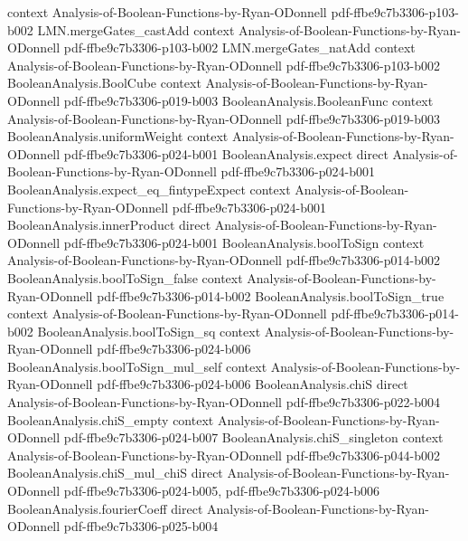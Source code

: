 \begin{lemma}
  {context}
  {Analysis-of-Boolean-Functions-by-Ryan-ODonnell}
  {pdf-ffbe9c7b3306-p103-b002}
\proofstep
  {LMN.mergeGates_castAdd}
  {context}
  {Analysis-of-Boolean-Functions-by-Ryan-ODonnell}
  {pdf-ffbe9c7b3306-p103-b002}
\proofstep
  {LMN.mergeGates_natAdd}
  {context}
  {Analysis-of-Boolean-Functions-by-Ryan-ODonnell}
  {pdf-ffbe9c7b3306-p103-b002}
\proofstep
  {BooleanAnalysis.BoolCube}
  {context}
  {Analysis-of-Boolean-Functions-by-Ryan-ODonnell}
  {pdf-ffbe9c7b3306-p019-b003}
\proofstep
  {BooleanAnalysis.BooleanFunc}
  {context}
  {Analysis-of-Boolean-Functions-by-Ryan-ODonnell}
  {pdf-ffbe9c7b3306-p019-b003}
\proofstep
  {BooleanAnalysis.uniformWeight}
  {context}
  {Analysis-of-Boolean-Functions-by-Ryan-ODonnell}
  {pdf-ffbe9c7b3306-p024-b001}
\proofstep
  {BooleanAnalysis.expect}
  {direct}
  {Analysis-of-Boolean-Functions-by-Ryan-ODonnell}
  {pdf-ffbe9c7b3306-p024-b001}
\proofstep
  {BooleanAnalysis.expect_eq_fintypeExpect}
  {context}
  {Analysis-of-Boolean-Functions-by-Ryan-ODonnell}
  {pdf-ffbe9c7b3306-p024-b001}
\proofstep
  {BooleanAnalysis.innerProduct}
  {direct}
  {Analysis-of-Boolean-Functions-by-Ryan-ODonnell}
  {pdf-ffbe9c7b3306-p024-b001}
\proofstep
  {BooleanAnalysis.boolToSign}
  {context}
  {Analysis-of-Boolean-Functions-by-Ryan-ODonnell}
  {pdf-ffbe9c7b3306-p014-b002}
\proofstep
  {BooleanAnalysis.boolToSign_false}
  {context}
  {Analysis-of-Boolean-Functions-by-Ryan-ODonnell}
  {pdf-ffbe9c7b3306-p014-b002}
\proofstep
  {BooleanAnalysis.boolToSign_true}
  {context}
  {Analysis-of-Boolean-Functions-by-Ryan-ODonnell}
  {pdf-ffbe9c7b3306-p014-b002}
\proofstep
  {BooleanAnalysis.boolToSign_sq}
  {context}
  {Analysis-of-Boolean-Functions-by-Ryan-ODonnell}
  {pdf-ffbe9c7b3306-p024-b006}
\proofstep
  {BooleanAnalysis.boolToSign_mul_self}
  {context}
  {Analysis-of-Boolean-Functions-by-Ryan-ODonnell}
  {pdf-ffbe9c7b3306-p024-b006}
\proofstep
  {BooleanAnalysis.chiS}
  {direct}
  {Analysis-of-Boolean-Functions-by-Ryan-ODonnell}
  {pdf-ffbe9c7b3306-p022-b004}
\proofstep
  {BooleanAnalysis.chiS_empty}
  {context}
  {Analysis-of-Boolean-Functions-by-Ryan-ODonnell}
  {pdf-ffbe9c7b3306-p024-b007}
\proofstep
  {BooleanAnalysis.chiS_singleton}
  {context}
  {Analysis-of-Boolean-Functions-by-Ryan-ODonnell}
  {pdf-ffbe9c7b3306-p044-b002}
\proofstep
  {BooleanAnalysis.chiS_mul_chiS}
  {direct}
  {Analysis-of-Boolean-Functions-by-Ryan-ODonnell}
  {pdf-ffbe9c7b3306-p024-b005,
    pdf-ffbe9c7b3306-p024-b006}
\proofstep
  {BooleanAnalysis.fourierCoeff}
  {direct}
  {Analysis-of-Boolean-Functions-by-Ryan-ODonnell}
  {pdf-ffbe9c7b3306-p025-b004}
\proofstep

\end{lemma}
